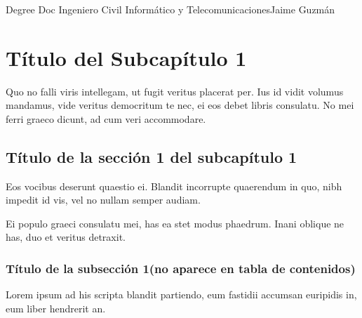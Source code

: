 \documentclass[thesis]{udpbook}
\begin{document}
\degreedoc
{ Degree Doc }{Ingeniero Civil Informático y Telecomunicaciones}{Jaime Guzmán}

\udplogo
 
\author{ Jaime Guzmán }








 


\section{Título del Subcapítulo 1 }\label{chsub:Título del Subcapítulo 1}

\parindent=0pt Quo no falli viris intellegam, ut fugit veritus placerat per. Ius id vidit volumus mandamus, vide veritus democritum te nec, ei eos debet libris consulatu. No mei ferri graeco dicunt, ad cum veri accommodare. 


\subsection{Título de la sección 1 del subcapítulo 1}\label{chsub:Título de la sección 1 del subcapítulo 1}


\parindent=0pt Eos vocibus deserunt quaestio ei. Blandit incorrupte quaerendum in quo, nibh impedit id vis, vel no nullam semper audiam. 

\vspace{0.5cm}
\parindent=30pt Ei populo graeci consulatu mei, has ea stet modus phaedrum. Inani oblique ne has, duo et veritus detraxit. 


\subsubsection{Título de la subsección 1(no aparece en tabla de contenidos)}\label{chsub:Título de la subsección 1}

\parindent=0pt Lorem ipsum ad his scripta blandit partiendo, eum fastidii accumsan euripidis in, eum liber hendrerit an. 
\end{document}
